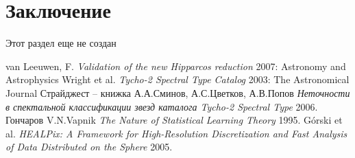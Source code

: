 \documentclass[14pt]{article}
\begin{document}
    \section{Заключение}

        Этот раздел еще не создан
        
    \begin{thebibliography}{1}
         van Leeuwen, F. {\em Validation of the new Hipparcos reduction}  2007: Astronomy and Astrophysics
         Wright et al. {\em Tycho-2 Spectral Type Catalog} 2003: The Astronomical Journal
         Страйджест – книжка
         А.А.Сминов, А.С.Цветков, А.В.Попов {\em Неточности в спектальной классификации звезд каталога Tycho-2 Spectral Type} 2006.
         Гончаров 
         V.N.Vapnik {\em The Nature of Statistical Learning Theory} 1995.
         Górski et al. {\em HEALPix: A Framework for High-Resolution Discretization and Fast Analysis of Data Distributed on the Sphere} 2005.
    \end{thebibliography}    
\end{document}
